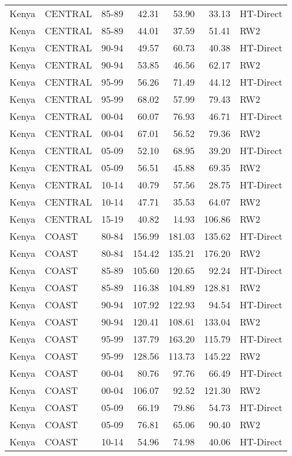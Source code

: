 \begin{longtable}{lllrrrl}
  Kenya & CENTRAL & 85-89 & 42.31 & 53.90 & 33.13 & HT-Direct \\ 
  Kenya & CENTRAL & 85-89 & 44.01 & 37.59 & 51.41 & RW2 \\ 
  Kenya & CENTRAL & 90-94 & 49.57 & 60.73 & 40.38 & HT-Direct \\ 
  Kenya & CENTRAL & 90-94 & 53.85 & 46.56 & 62.17 & RW2 \\ 
  Kenya & CENTRAL & 95-99 & 56.26 & 71.49 & 44.12 & HT-Direct \\ 
  Kenya & CENTRAL & 95-99 & 68.02 & 57.99 & 79.43 & RW2 \\ 
  Kenya & CENTRAL & 00-04 & 60.07 & 76.93 & 46.71 & HT-Direct \\ 
  Kenya & CENTRAL & 00-04 & 67.01 & 56.52 & 79.36 & RW2 \\ 
  Kenya & CENTRAL & 05-09 & 52.10 & 68.95 & 39.20 & HT-Direct \\ 
  Kenya & CENTRAL & 05-09 & 56.51 & 45.88 & 69.35 & RW2 \\ 
  Kenya & CENTRAL & 10-14 & 40.79 & 57.56 & 28.75 & HT-Direct \\ 
  Kenya & CENTRAL & 10-14 & 47.71 & 35.53 & 64.07 & RW2 \\ 
  Kenya & CENTRAL & 15-19 & 40.82 & 14.93 & 106.86 & RW2 \\ 
  Kenya & COAST & 80-84 & 156.99 & 181.03 & 135.62 & HT-Direct \\ 
  Kenya & COAST & 80-84 & 154.42 & 135.21 & 176.20 & RW2 \\ 
  Kenya & COAST & 85-89 & 105.60 & 120.65 & 92.24 & HT-Direct \\ 
  Kenya & COAST & 85-89 & 116.38 & 104.89 & 128.81 & RW2 \\ 
  Kenya & COAST & 90-94 & 107.92 & 122.93 & 94.54 & HT-Direct \\ 
  Kenya & COAST & 90-94 & 120.41 & 108.61 & 133.04 & RW2 \\ 
  Kenya & COAST & 95-99 & 137.79 & 163.20 & 115.79 & HT-Direct \\ 
  Kenya & COAST & 95-99 & 128.56 & 113.73 & 145.22 & RW2 \\ 
  Kenya & COAST & 00-04 & 80.76 & 97.76 & 66.49 & HT-Direct \\ 
  Kenya & COAST & 00-04 & 106.07 & 92.52 & 121.30 & RW2 \\ 
  Kenya & COAST & 05-09 & 66.19 & 79.86 & 54.73 & HT-Direct \\ 
  Kenya & COAST & 05-09 & 76.81 & 65.06 & 90.40 & RW2 \\ 
  Kenya & COAST & 10-14 & 54.96 & 74.98 & 40.06 & HT-Direct \\ 

\end{longtable}
